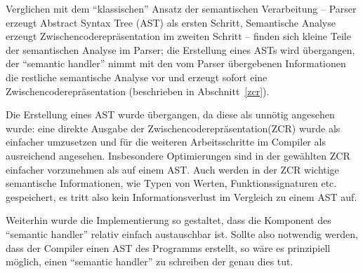 \documentclass[twoside,a4paper,fleqn,12pt]{article}
\begin{document}


Verglichen mit dem "`klassischen"' Ansatz der semantischen Verarbeitung -- Parser erzeugt Abstract Syntax Tree (AST) als ersten Schritt,
Semantische Analyse erzeugt Zwischencoderepräsentation im zweiten Schritt -- finden sich kleine Teile der semantischen
Analyse im Parser; die Erstellung eines ASTs wird übergangen, der ``semantic handler'' nimmt mit den vom
Parser übergebenen Informationen die restliche semantische Analyse vor und erzeugt sofort eine Zwischencoderepräsentation (beschrieben in Abschnitt~\ref{zcr}).

Die Erstellung eines AST wurde übergangen, da diese als unnötig angesehen wurde: eine direkte Ausgabe der Zwischencoderepräsentation(ZCR)
wurde als einfacher umzusetzen und für die weiteren Arbeitsschritte im Compiler als ausreichend angesehen. 
Insbesondere Optimierungen sind in der gewählten ZCR einfacher vorzunehmen als auf
einem AST. Auch werden in der ZCR wichtige semantische Informationen, wie Typen von Werten, Funktionssignaturen etc. gespeichert,
es tritt also kein Informationsverlust im Vergleich zu einem AST auf.

Weiterhin wurde die Implementierung so gestaltet, dass die Komponent des ``semantic handler'' relativ einfach austauschbar ist.
Sollte also notwendig werden, dass der Compiler einen AST des Programms erstellt, so wäre es prinzipiell möglich,
einen ``semantic handler'' zu schreiben der genau dies tut.

\end{document}

